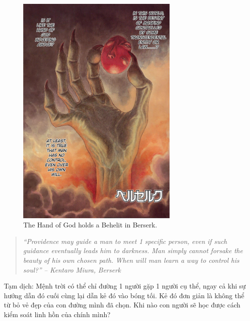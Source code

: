 \documentclass[12pt,twoside]{book}
\begin{document}
\begin{figure}[H]
	\centering
	\includegraphics[width = 8cm]{Berserk_behelit_color}
	\caption{The Hand of God holds a Behelit in Berserk.}
\end{figure}

\begin{quotation}\it
	``Providence may guide a man to meet 1 specific person, even if such guidance eventually leads him to darkness. Man simply cannot forsake the beauty of his own chosen path. When will man learn a way to control his soul?'' -- {\sc Kentaro Miura}, {\it Berserk}
\end{quotation}
{\sf Tạm dịch}: Mệnh trời có thể chỉ đường 1 người gặp 1 người cụ thể, ngay cả khi sự hướng dẫn đó cuối cùng lại dẫn kẻ đó vào bóng tối. Kẻ đó đơn giản là không thể từ bỏ vẻ đẹp của con đường mình đã chọn. Khi nào con người sẽ học được cách kiểm soát linh hồn của chính mình?
	
\end{document}
